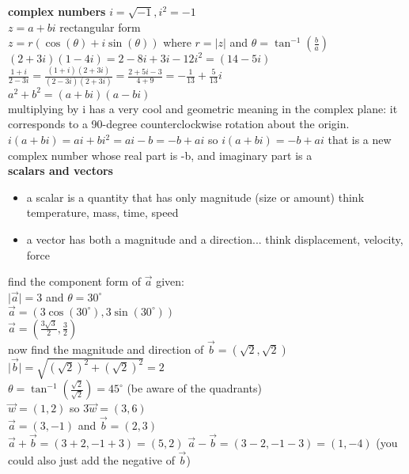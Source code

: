 \documentclass{article}
\begin{document}
\textbf{complex numbers}
	$i = \sqrt{-1}, i^2 = -1$\\
	$z = a + bi$ rectangular form\\
	$z = r(\cos(\theta) + i\sin(\theta))$ where $r = \lvert z\rvert$ and $\theta = \tan^{-1}(\frac{b}{a})$\\

	$(2 + 3i)(1 - 4i) = 2 - 8i + 3i - 12i^2 = (14 - 5i)$\\
	$\frac{1 + i}{2 - 3i} = \frac{(1 + i)(2 + 3i)}{(2 - 3i)(2 + 3i)} = \frac{2 + 5i - 3}{4 + 9} = -\frac{1}{13} + \frac{5}{13}i$\\	
	$a^2 + b^2 = (a + bi)(a - bi)$\\

	multiplying by i has a very cool and geometric meaning in the complex plane: it corresponds to a 90-degree counterclockwise rotation about the origin.\\

	$i(a + bi) = ai + bi^2 = ai - b = -b + ai$ so $i(a + bi) = -b + ai$ that is a new complex number whose real part is -b, and imaginary part is a\\

\textbf{scalars and vectors}
	\begin{itemize}
		\item a scalar is a quantity that has only magnitude (size or amount) think temperature, mass, time, speed
		\item a vector has both a magnitude and a direction... think displacement, velocity, force
	\end{itemize}

	find the component form of $\vec{a}$ given:\\
	$\lvert\vec{a}\rvert = 3$ and $\theta = 30^{\circ}$\\
	$\vec{a} = (3\cos(30^{\circ}), 3\sin(30^{\circ}))$\\
	$\vec{a} = (\frac{3\sqrt{3}}{2}, \frac{3}{2})$\\

	now find the magnitude and direction of $\vec{b} = (\sqrt{2}, \sqrt{2})$\\
	$\lvert\vec{b}\rvert = \sqrt{(\sqrt{2})^2 + (\sqrt{2})^2} = 2$\\
	$\theta = \tan^{-1}(\frac{\sqrt{2}}{\sqrt{2}}) = 45^{\circ}$ (be aware of the quadrants)\\

	$\vec{w} = (1, 2)$ so $3\vec{w} = (3, 6)$\\

	$\vec{a} = (3, -1)$ and $\vec{b} = (2, 3)$\\
	$\vec{a} + \vec{b} = (3+2, -1+3) = (5, 2)$
	$\vec{a} - \vec{b} = (3-2, -1-3) = (1, -4)$ (you could also just add the negative of $\vec{b}$)\\
\end{document}

